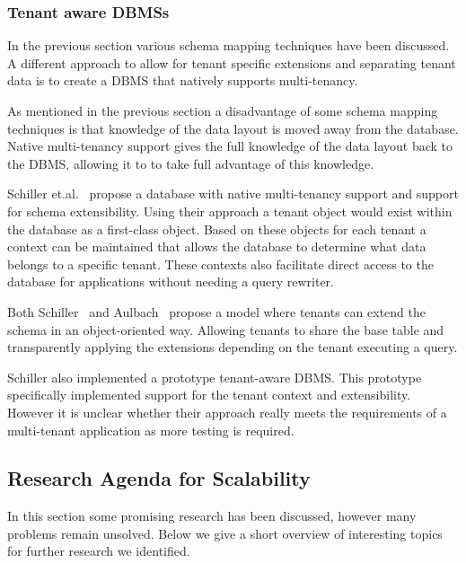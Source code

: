 \subsubsection{Tenant aware \acp{DBMS}}
In the previous section various schema mapping techniques have been discussed.
A different approach to allow for tenant specific extensions and separating tenant data is to create a \ac{DBMS} that natively supports multi-tenancy.

As mentioned in the previous section a disadvantage of some schema mapping techniques is that knowledge of the data layout is moved away from the database.
Native multi-tenancy support gives the full knowledge of the data layout back to the \ac{DBMS}, allowing it to to take full advantage of this knowledge.~\cite{schiller2011native}

Schiller et.al.~\cite{schiller2011native} propose a database with native multi-tenancy support and support for schema extensibility.
Using their approach a tenant object would exist within the database as a first-class object. 
Based on these objects for each tenant a context can be maintained that allows the database to determine what data belongs to a specific tenant. 
These contexts also facilitate direct access to the database for applications without needing a query rewriter.

Both Schiller~\cite{schiller2011native} and Aulbach~\cite{aulbach2011extensibility} propose a model where tenants can extend the schema in an object-oriented way.
Allowing tenants to share the base table and transparently applying the extensions depending on the tenant executing a query.

Schiller also implemented a prototype tenant-aware \ac{DBMS}.
This prototype specifically implemented support for the tenant context and extensibility.
However it is unclear whether their approach really meets the requirements of a multi-tenant application as more testing is required.


\subsection{Research Agenda for Scalability}
In this section some promising research has been discussed, however many problems remain unsolved.
Below we give a short overview of interesting topics for further research we identified.

